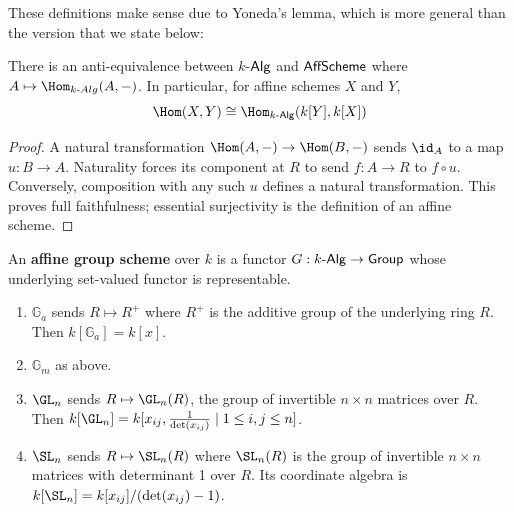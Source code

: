 These definitions make sense due to Yoneda's lemma, which is more general than the version that we state below:
\begin{theorem}
There is an anti-equivalence between $k$-$\sf Alg$ and $\sf AffScheme$ where $A \mapsto \Hom_{k\text{-}{Alg}}(A,-)$. In particular, for affine schemes $X$ and $Y$, 
\[
	\Hom(X,Y) \cong \Hom_{k\text{-}{\sf Alg}}(k[Y],k[X])
\] 
\end{theorem}
\begin{proof}
A natural transformation $\Hom(A,-)\to\Hom(B,-)$ sends $\id_A$ to a
map $u:B\to A$. Naturality forces its component at $R$ to send
$f:A\to R$ to $f\circ u$. Conversely, composition with any such $u$
defines a natural transformation. This proves full faithfulness; essential
surjectivity is the definition of an affine scheme.
\end{proof}


\begin{definition}
An \textbf{affine group scheme} over $k$ is a functor $G: k\text{-}{\sf Alg} \to {\sf Group}$ whose underlying set-valued functor is representable.
\end{definition}

\begin{example}
\begin{enumerate}[1)]
	\item $\mathbb{G}_a$ sends $R \mapsto R^+$ where $R^+$ is the additive group of the underlying ring $R$. Then $k[\mathbb{G}_a] = k[x]$.
	\item $\mathbb{G}_m$ as above.
	\item $\GL_n$ sends $R \mapsto \GL_n(R)$, the group of invertible $n \times n$ matrices over $R$. Then $k[\GL_n] = k[x_{ij},\tfrac{1}{\det(x_{ij})}\;|\; 1 \leq i,j \leq n]$.
	\item $\SL_n$ sends $R \mapsto \SL_n(R)$ where $\SL_n(R)$ is the group of invertible $n \times n $ matrices with determinant 1 over $R$. Its coordinate algebra is
$k[\SL_n]=k[x_{ij}]/(\det(x_{ij})-1)$.
\end{enumerate}
\end{example}

